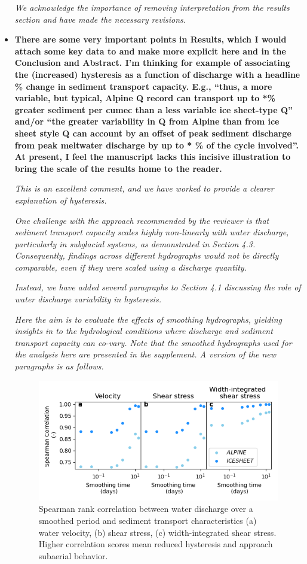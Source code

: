 \documentclass[11pt]{article}
\begin{document}
\begin{itemize}
\textit{We acknowledge the importance of removing interpretation from the results section and have made the necessary revisions.
}


  
\item \textbf{There are some very important points in Results, which I would attach some key data to
    and make more explicit here and in the Conclusion and Abstract. I’m thinking for example of
    associating the (increased) hysteresis as a function of discharge with a headline \% change in
    sediment transport capacity. E.g., “thus, a more variable, but typical, Alpine Q record can
    transport up to *\% greater sediment per cumec than a less variable ice sheet-type Q” and/or “the
    greater variability in Q from Alpine than from ice sheet style Q can account by an offset of peak
    sediment discharge from peak meltwater discharge by up to * \% of the cycle involved”. At present,
    I feel the manuscript lacks this incisive illustration to bring the scale of the results home to the
    reader.}

  \textit{This is an excellent comment, and we have worked to provide a clearer explanation of hysteresis.}

\textit{One challenge with the approach recommended by the reviewer is that sediment transport capacity scales highly non-linearly with water discharge, particularly in subglacial systems, as demonstrated in Section 4.3. Consequently, findings across different hydrographs would not be directly comparable, even if they were scaled using a discharge quantity.}

\textit{Instead, we have added several paragraphs to Section 4.1 discussing the role of water discharge variability in hysteresis.}

  \textit{Here the aim is to evaluate the effects of smoothing hydrographs, yielding insights in to the hydrological conditions where discharge and sediment transport capacity can co-vary.
    Note that the smoothed hydrographs used for the analysis here are presented in the supplement. 
    A version of the new paragraphs is as follows.}


\begin{figure}[H]
  \centering
  \includegraphics[width=0.8\linewidth]{../Fig4.png}
  \caption{Spearman rank correlation between water discharge over a smoothed period and sediment transport characteristics (a) water velocity, (b) shear stress, (c) width-integrated shear stress. Higher correlation scores mean reduced hysteresis and approach subaerial behavior.
  }
  \label{fig:corri}
\end{figure}


\end{itemize}
\end{document}
